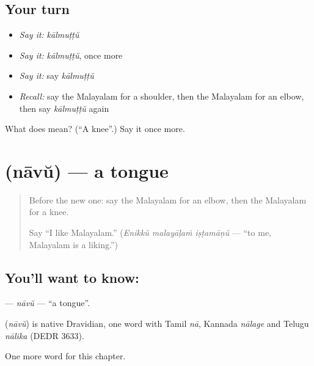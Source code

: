 \subsection*{Your turn}
\begin{itemize}
\raggedright
  \item \emph{Say it:} \emph{kālmuṭṭŭ}
  \item \emph{Say it:} \emph{kālmuṭṭŭ}, once more
  \item \emph{Say it:} say \emph{kālmuṭṭŭ}
  \item \emph{Recall:} say the Malayalam for a shoulder, then the Malayalam for an elbow, then say \emph{kālmuṭṭŭ} again
\end{itemize}

\begin{tcolorbox}[breakable,colback=teal!4,colframe=teal!35!black,title={Before you move on}]
What does  mean? (\textquotedblleft{}A knee\textquotedblright{}.) Say it once more.
\end{tcolorbox}
\section[\texorpdfstring{\ml{നാവ്} (nāvŭ)}{നാവ് (nāvŭ)}]{ (nāvŭ) — a tongue}

\label{lesson:ML-C154-navu}



\begin{quote}
Before the new one: say the Malayalam for an elbow, then the Malayalam for a knee.

Say \textquotedblleft{}I like Malayalam.\textquotedblright{} (\emph{Enikkŭ malayāḷaṁ iṣṭamāṇŭ} — \textquotedblleft{}to me, Malayalam is a liking.\textquotedblright{})
\end{quote}

\subsection*{You'll want to know: }
\textbf{} — \emph{nāvŭ} — \textquotedblleft{}a tongue\textquotedblright{}.

\begin{cousinweb}
\textbf{} (\emph{nāvŭ}) is native Dravidian, one word with Tamil \emph{nā}, Kannada \emph{nālage} and Telugu \emph{nālika} (DEDR 3633).
\end{cousinweb}

\begin{grammarlens}[title={What you've built}]
One more word for this chapter.
\end{grammarlens}

